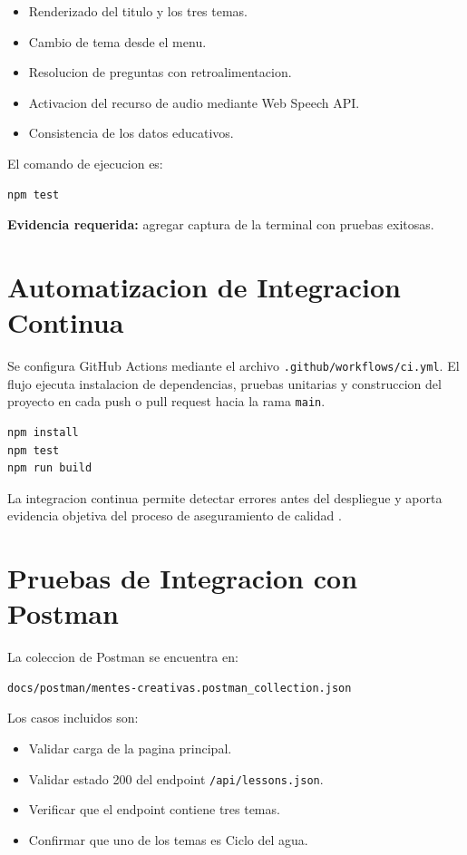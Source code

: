 \documentclass[man,12pt]{apa7}
\begin{document}
\begin{itemize}
  \item Renderizado del titulo y los tres temas.
  \item Cambio de tema desde el menu.
  \item Resolucion de preguntas con retroalimentacion.
  \item Activacion del recurso de audio mediante Web Speech API.
  \item Consistencia de los datos educativos.
\end{itemize}

El comando de ejecucion es:

\begin{lstlisting}[style=codigo]
npm test
\end{lstlisting}

\textbf{Evidencia requerida:} agregar captura de la terminal con pruebas exitosas.

\section{Automatizacion de Integracion Continua}

Se configura GitHub Actions mediante el archivo \texttt{.github/workflows/ci.yml}. El flujo ejecuta instalacion de dependencias, pruebas unitarias y construccion del proyecto en cada push o pull request hacia la rama \texttt{main}.

\begin{lstlisting}[style=codigo]
npm install
npm test
npm run build
\end{lstlisting}

La integracion continua permite detectar errores antes del despliegue y aporta evidencia objetiva del proceso de aseguramiento de calidad \parencite{githubActionsDocs}.

\section{Pruebas de Integracion con Postman}

La coleccion de Postman se encuentra en:

\begin{lstlisting}[style=codigo]
docs/postman/mentes-creativas.postman_collection.json
\end{lstlisting}

Los casos incluidos son:

\begin{itemize}
  \item Validar carga de la pagina principal.
  \item Validar estado 200 del endpoint \texttt{/api/lessons.json}.
  \item Verificar que el endpoint contiene tres temas.
  \item Confirmar que uno de los temas es Ciclo del agua.
\end{itemize}
\end{document}
